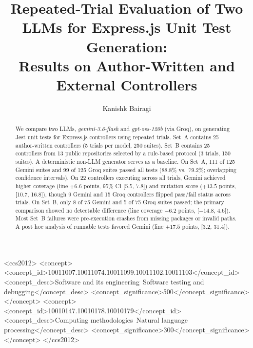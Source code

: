 \documentclass[sigconf]{acmart}
\begin{document}
\title{Repeated-Trial Evaluation of Two LLMs for Express.js Unit Test Generation:\\ Results on Author-Written and External Controllers}

\author{Kanishk Bairagi}

\begin{abstract}
We compare two LLMs, \textit{gemini-3.6-flash} and \textit{gpt-oss-120b} (via Groq), on generating Jest unit tests for Express.js controllers using repeated trials. Set~A contains 25 author-written controllers (5 trials per model, 250 suites). Set~B contains 25 controllers from 13 public repositories selected by a rule-based protocol (3 trials, 150 suites). A deterministic non-LLM generator serves as a baseline. On Set~A, 111 of 125 Gemini suites and 99 of 125 Groq suites passed all tests (88.8\% vs.\ 79.2\%; overlapping confidence intervals). On 22 controllers executing across all trials, Gemini achieved higher coverage (line $+6.6$ points, 95\% CI [5.5, 7.8]) and mutation score ($+13.5$ points, [10.7, 16.8]), though 9 Gemini and 15 Groq controllers flipped pass/fail status across trials. On Set~B, only 8 of 75 Gemini and 5 of 75 Groq suites passed; the primary comparison showed no detectable difference (line coverage $-6.2$ points, [$-14.8$, 4.6]). Most Set~B failures were pre-execution crashes from missing packages or invalid paths. A post hoc analysis of runnable tests favored Gemini (line $+17.5$ points, [3.2, 31.4]).
\end{abstract}

\begin{CCSXML}
<ccs2012>
   <concept>
       <concept_id>10011007.10011074.10011099.10011102.10011103</concept_id>
       <concept_desc>Software and its engineering~Software testing and debugging</concept_desc>
       <concept_significance>500</concept_significance>
       </concept>
   <concept>
       <concept_id>10010147.10010178.10010179</concept_id>
       <concept_desc>Computing methodologies~Natural language processing</concept_desc>
       <concept_significance>300</concept_significance>
       </concept>
 </ccs2012>
\end{CCSXML}


\end{document}
